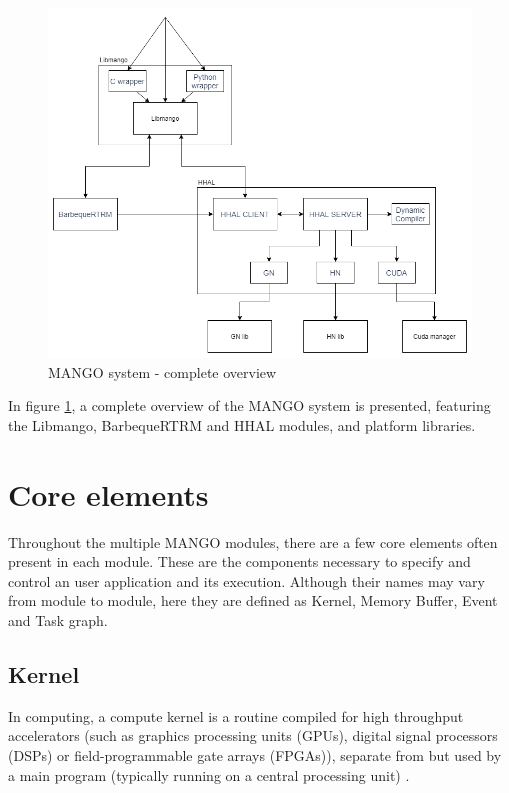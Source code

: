 \begin{figure}[ht]
    \centering
    \includegraphics[width=\textwidth]{img/architecture.png}
    \captionsetup{justification=centering}
    \caption{MANGO system - complete overview}
    \label{fig:mango_system_overview}
\end{figure}

In figure \ref{fig:mango_system_overview}, a complete overview of the MANGO system is presented, featuring the Libmango, BarbequeRTRM and HHAL modules, and platform libraries.

\section{Core elements}
Throughout the multiple MANGO modules, there are a few core elements often present in each module. These are the components necessary to specify and control an user application and its execution. Although their names may vary from module to module, here they are defined as Kernel, Memory Buffer, Event and Task graph.

\subsection{Kernel}
In computing, a compute kernel is a routine compiled for high throughput accelerators (such as graphics processing units (GPUs), digital signal processors (DSPs) or field-programmable gate arrays (FPGAs)), separate from but used by a main program (typically running on a central processing unit) \cite{kernel_wikipedia}. 

